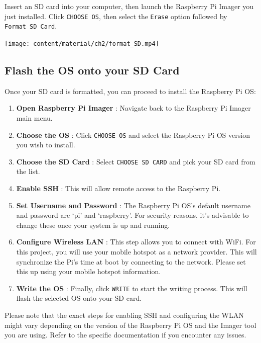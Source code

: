 \documentclass[
  letterpaper,
]{scrbook}
\providecommand{\tightlist}{%
  \setlength{\itemsep}{0pt}\setlength{\parskip}{0pt}}\usepackage{longtable,booktabs,array}
\begin{document}
Insert an SD card into your computer, then launch the Raspberry Pi
Imager you just installed. Click \texttt{CHOOSE\ OS}, then select the
\texttt{Erase} option followed by \texttt{Format\ SD\ Card}.

\texttt{[image: content/material/ch2/format\_SD.mp4]}

\hypertarget{flash-the-os-onto-your-sd-card}{%
\subsection{Flash the OS onto your SD
Card}\label{flash-the-os-onto-your-sd-card}}

Once your SD card is formatted, you can proceed to install the Raspberry
Pi OS:

\begin{enumerate}
\def\labelenumi{\arabic{enumi}.}
\tightlist
\item
  \textbf{Open Raspberry Pi Imager} : Navigate back to the Raspberry Pi
  Imager main menu.
\item
  \textbf{Choose the OS} : Click \texttt{CHOOSE\ OS} and select the
  Raspberry Pi OS version you wish to install.
\item
  \textbf{Choose the SD Card} : Select \texttt{CHOOSE\ SD\ CARD} and
  pick your SD card from the list.
\item
  \textbf{Enable SSH} : This will allow remote access to the Raspberry
  Pi.
\item
  \textbf{Set Username and Password} : The Raspberry Pi OS's default
  username and password are `pi' and `raspberry'. For security reasons,
  it's advisable to change these once your system is up and running.
\item
  \textbf{Configure Wireless LAN} : This step allows you to connect with
  WiFi. For this project, you will use your mobile hotspot as a network
  provider. This will synchronize the Pi's time at boot by connecting to
  the network. Please set this up using your mobile hotspot information.
\item
  \textbf{Write the OS} : Finally, click \texttt{WRITE} to start the
  writing process. This will flash the selected OS onto your SD card.
\end{enumerate}

Please note that the exact steps for enabling SSH and configuring the
WLAN might vary depending on the version of the Raspberry Pi OS and the
Imager tool you are using. Refer to the specific documentation if you
encounter any issues.
\end{document}
